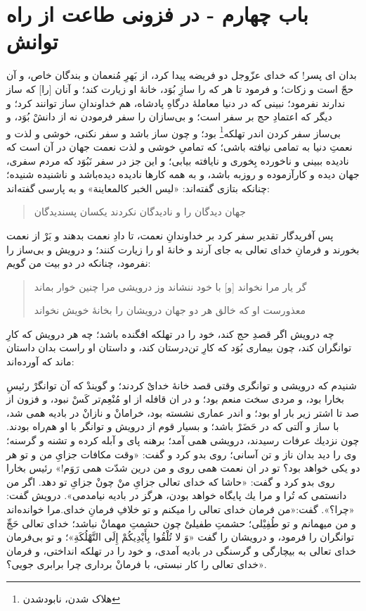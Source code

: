 \section*{باب چهارم - در فزونی طاعت از راه توانش}


بدان اى پسر! كه خداى عزّوجل دو فريضه پيدا كرد، از بَهرِ مُنعمان و بندگان خاص، و آن حجّ‌ است و زكات؛ و فرمود تا هر كه را سازِ بُوَد، خانۀ او زيارت كند؛ و آنان [را] كه ساز ندارند نفرمود؛ نبينى كه در دنيا معاملۀ درگاهِ پادشاه، هم خداوندانِ ساز توانند كرد؛ و ديگر كه اعتمادِ حج بر سفر است؛ و بى‌سازان را سفر فرمودن نه از دانشْ بُوَد، و بى‌ساز سفر كردن اندر تهلكه\footnote{هلاک شدن، نابودشدن} بود؛ و چون ساز باشد و سفر نكنى، خوشی و لذت و نعمتِ دنيا به تمامى نيافته باشى؛ كه تمامیِ خوشى و لذت نعمت جهان در آن است كه ناديده ببينى و ناخورده بِخورى و نايافته بيابى؛ و اين جز در سفر نَبُوَد كه مردم سفرى، جهان ديده و كارآزموده و روزبه باشد، و به همه كارها ناديده ديده‌باشد و ناشنيده شنيده؛ چنانكه بتازى گفته‌اند: «ليس الخبر كالمعاينة» و به پارسى گفته‌اند:
\begin{quote}
\centering
جهان ديدگان را و ناديدگان \quad \quad
نكردند يكسان پسنديدگان
\end{quote}

پس آفريدگار تقدير سفر كرد بر خداوندانِ نعمت، تا دادِ نعمت بدهند و بَرْ از نعمت بخورند و فرمانِ خداى تعالى به جاى آرند و خانۀ او را زيارت كنند؛ و درويش و بى‌ساز را نفرمود، چنانكه در دو بيت من گويم:

\begin{quote}
\centering
گر يار مرا نخواند [و] با خود ننشاند\quad \quad
وز درويشى مرا چنين خوار بماند


معذورست او كه خالق هر دو جهان \quad \quad 
درويشان را بخانۀ خويش نخواند
\end{quote}

چه درويش اگر قصدِ حج كند، خود را در تهلكه افگنده باشد؛ چه هر درويش كه كارِ توانگران كند، چون بيمارى بُوَد كه كارِ تن‌درستان كند، و داستان او راست بدان داستان ماند كه آورده‌اند:

 شنيدم كه درويشى و توانگرى وقتى قصد خانۀ خداىْ كردند؛ و گويندْ كه آن توانگرْ رئيسِ بخارا بود، و مردى سخت منعم بود؛ و در ان قافله از او مُنْعِم‌تر كَسْ نبود، و فزون از صد تا اشتر زير بار او بود؛ و اندر عمارى نشسته بود، خرامانْ و نازانْ در باديه همى شد، با ساز و آلتى كه در حَضَرْ باشد؛ و بسيار قوم از درويش و توانگر با او هم‌راه بودند. چون نزديك عرفات رسيدند، درويشى همى آمد؛ برهنه پاى و آبله كرده و تشنه و گرسنه؛ وى را ديد بدان ناز و تن آسانى؛ روى بدو كرد و گفت: «وقت مكافات جزاىِ من و تو هر دو يكى خواهد بود؟ تو در ان نعمت همى روى و من درين شدّت همى رَوَم!» رئيس بخارا روى بدو كرد و گفت: «حاشا كه خداى تعالى جزاىِ منْ چونْ جزاىِ تو دهد. اگر من دانستمى كه تُرا و مرا يك پايگاه خواهد بودن، هرگز در باديه نيامدمى». درويش گفت: «چرا؟». گفت:«من فرمان خداى تعالى را ميكنم و تو خلافِ فرمانِ خداى.مرا خوانده‌اند و من ميهمانم و تو طُفِيْلى؛ حشمتِ طفيلىْ چون حشمتِ مهمانْ نباشد؛ خداى تعالى حَجِّ توانگران را فرمود، و درويشان را گفت «وَ لا تُلْقُوا بِأَيْدِيكُمْ إِلَى التَّهْلُكَةِ»؛ و تو بى‌فرمان خداى تعالى به بيچارگى و گرسنگى در باديه آمدى، و خود را در تهلكه انداختى، و فرمان خداى تعالى را كار نبستى، با فرمانْ بردارى چرا برابرى جويى‌؟».


